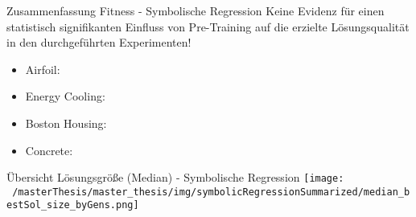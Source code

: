 \documentclass[
  ignorenonframetext,
]{beamer}
\providecommand{\tightlist}{%
  \setlength{\itemsep}{0pt}\setlength{\parskip}{0pt}}
\begin{document}
\begin{frame}{Zusammenfassung Fitness - Symbolische Regression}
\protect\hypertarget{zusammenfassung-fitness---symbolische-regression}{}
Keine Evidenz für einen statistisch signifikanten Einfluss von
Pre-Training auf die erzielte Lösungsqualität in den durchgeführten
Experimenten!

\begin{itemize}
\tightlist
\item
  Airfoil:
\item
  Energy Cooling:
\item
  Boston Housing:
\item
  Concrete:
\end{itemize}
\end{frame}

\begin{frame}{Übersicht Lösungsgröße (Median) - Symbolische Regression}
\protect\hypertarget{uxfcbersicht-luxf6sungsgruxf6uxdfe-median---symbolische-regression}{}
\texttt{[image: ~/masterThesis/master\_thesis/img/symbolicRegressionSummarized/median\_bestSol\_size\_byGens.png]}
\end{frame}
\end{document}
